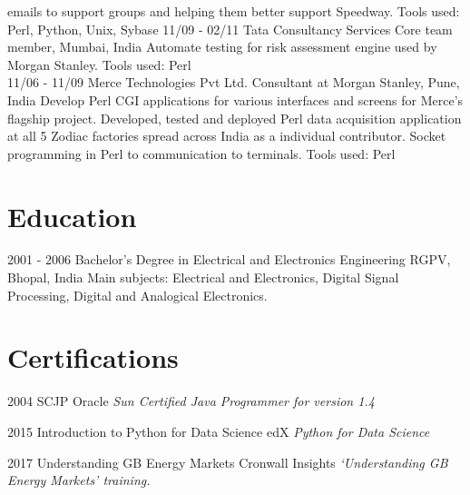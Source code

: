 \documentclass[]{friggeri-cv}
\begin{document}
\begin{entrylist}
{    emails to support groups and helping them better support Speedway. Tools used: Perl, Python, Unix, Sybase}
    \entry
    {11/09 - 02/11}
    {Tata Consultancy Services}
    {Core team member, Mumbai, India}
    {Automate testing for risk assessment engine used by Morgan Stanley. Tools used: Perl\\}
    \entry
    {11/06 - 11/09}
    {Merce Technologies Pvt Ltd.}
    {Consultant at Morgan Stanley, Pune, India}
    {Develop Perl CGI applications for various interfaces and screens for Merce's flagship project. Developed, tested and deployed Perl data acquisition application at all 5 Zodiac factories spread across India as a individual contributor. Socket programming in Perl to communication to terminals. Tools used: Perl\\}
\end{entrylist}

\section{Education}
\begin{entrylist}
  \entry
    {2001 - 2006}
    {Bachelor's Degree in Electrical and Electronics  Engineering}
    {RGPV, Bhopal, India}
    {Main subjects: Electrical and Electronics, Digital Signal Processing, Digital and Analogical Electronics.\\
    }
 
\end{entrylist}

\section{Certifications}
\begin{entrylist}
  \entry
    {2004}
    {SCJP}
    {Oracle}
    {\emph{Sun Certified Java Programmer for version 1.4}}
    
  \entry
    {2015}
    {Introduction to Python for Data Science}
    {edX}
    {\emph{Python for Data Science}}

  \entry
    {2017}
    {Understanding GB Energy Markets}
    {Cronwall Insights}
    {\emph{‘Understanding GB Energy Markets’ training.}}
\end{entrylist}


\end{document}
